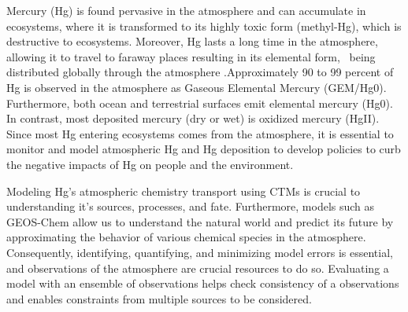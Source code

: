 \begin{flushleft}
Mercury (Hg) is found pervasive in the atmosphere and can accumulate in ecosystems, where it is transformed to its highly toxic form (methyl-Hg), which is destructive to ecosystems. Moreover, Hg lasts a long time in the atmosphere, allowing it to travel to faraway places resulting in  its elemental form, \hg \ being distributed globally through the atmosphere \cite{horowitz_new_2017,shah_improved_2021}.Approximately 90 to 99 percent of Hg is observed in the atmosphere as Gaseous Elemental Mercury (GEM/Hg0). Furthermore, both ocean and terrestrial surfaces emit elemental mercury (Hg0). In contrast, most deposited mercury (dry or wet) is oxidized mercury (HgII). Since most Hg entering ecosystems comes from the atmosphere, it is essential to monitor and model atmospheric Hg and Hg deposition to develop policies to curb the negative impacts of Hg on people and the environment.
\end{flushleft}
\begin{flushleft}

Modeling Hg's atmospheric chemistry transport using CTMs is crucial to understanding it's sources, processes, and fate. Furthermore, models such as GEOS-Chem allow us to understand the natural world and predict its future by approximating the behavior of various chemical species in the atmosphere. Consequently, identifying, quantifying, and minimizing model errors is essential, and observations of the atmosphere are crucial resources to do so. Evaluating a model with an ensemble of observations helps check consistency of a observations and enables constraints from multiple sources to be considered\cite{brasseur_modeling_2017}.
 \end{flushleft}
